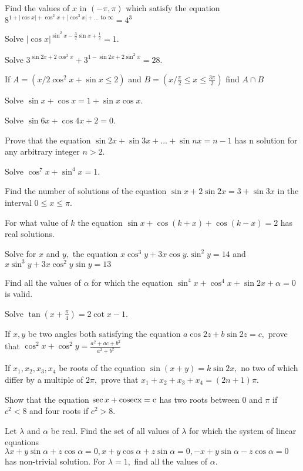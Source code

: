 \item Find the values of $x$ in  $(-\pi, \pi)$ which satisfy the equation $8^{1 + |\cos x| + \cos^2x + |\cos^3 x| +
    \ldots \text{~to~}\infty} = 4^3$
\item Solve $|\cos x|^{\sin^2x - \frac{3}{2}\sin x + \frac{1}{2}} = 1.$
\item Solve $3^{\sin2x + 2\cos^2x} + 3^{1 -\sin2x + 2\sin^2x} = 28.$
\item If $A = (x/2\cos^2x + \sin x\leq 2)$ and $B = \left(x/\frac{\pi}{2}\leq x\leq \frac{3\pi}{2}\right)$ find
    $A\cap B$
\item Solve $\sin x + \cos x = 1 + \sin x\cos x.$
\item Solve $\sin6x + \cos4x + 2 = 0.$
\item Prove that the equation $\sin2x + \sin3x + \ldots + \sin nx = n - 1$ has n solution for any arbitrary integer
    $n>2.$
\item Solve $\cos^7x + \sin^4x = 1.$
\item Find the number of solutions of the equation $\sin x + 2\sin2x = 3 + \sin3x$ in the interval $0\leq x\leq \pi.$
\item For what value of $k$ the equation $\sin x + \cos(k + x) + \cos(k - x) = 2$ has real solutions.
\item Solve for $x$ and $y,$ the equation $x\cos^3y + 3x\cos y.\sin^2y = 14$ and $x\sin^3y + 3x\cos^2y\sin y
     = 13$
\item Find all the values of $\alpha$ for which the equation $\sin^4x + \cos^4x + \sin2x + \alpha = 0$ is valid.
\item Solve $\tan\left(x + \frac{\pi}{4}\right) = 2\cot x - 1.$
\item If $x, y$ be two angles both satisfying the equation $a\cos 2z + b\sin2z = c,$ prove that $\cos^2x + \cos^2y = \frac{a^2 + ac + b^2}{a^2 + b^2}$
\item If $x_1, x_2, x_3, x_4$ be roots of the equation $\sin(x + y) = k\sin 2x,$ no two of which differ by a multiple of
     $2\pi,$ prove that $x_1 + x_2 + x_3 + x_4 = (2n + 1)\pi.$
\item Show that the equation $\sec x + \rm cosec x = c$ has two roots between $0$ and $\pi$ if $c^2<8$ and four
     roots if $c^2 > 8.$
\item Let $\lambda$ and $\alpha$ be real. Find the set of all values of $\lambda$ for which the system of linear
     equations $\lambda x + y\sin\alpha + z\cos\alpha = 0, x + y\cos\alpha + z\sin\alpha = 0, -x + y\sin\alpha - z\cos\alpha
     = 0$ has non-trivial solution. For $\lambda = 1,$ find all the values of $\alpha.$
